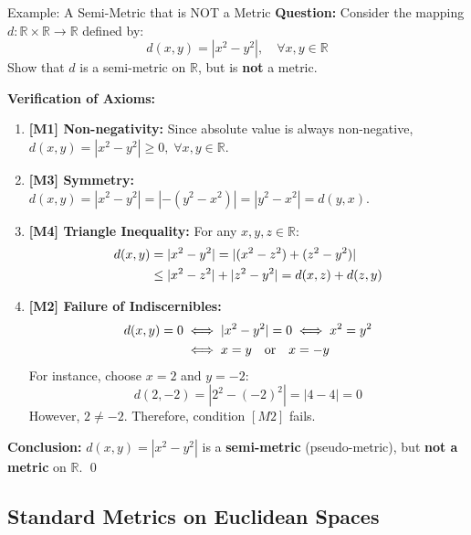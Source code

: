 \documentclass[11pt,a4paper]{article}
\begin{document}
\begin{exbox}{Example: A Semi-Metric that is NOT a Metric}
\textbf{Question:} Consider the mapping $d: \mathbb{R} \times \mathbb{R} \to \mathbb{R}$ defined by:
\begin{equation}
    d(x, y) = |x^2 - y^2|, \quad \forall x, y \in \mathbb{R}
\end{equation}
Show that $d$ is a semi-metric on $\mathbb{R}$, but is \textbf{not} a metric.

\textbf{Verification of Axioms:}
\begin{enumerate}
    \item \textbf{[M1] Non-negativity:} Since absolute value is always non-negative, $d(x, y) = |x^2 - y^2| \ge 0, \; \forall x, y \in \mathbb{R}$.
    
    \item \textbf{[M3] Symmetry:} $d(x, y) = |x^2 - y^2| = |-(y^2 - x^2)| = |y^2 - x^2| = d(y, x)$.
    
    \item \textbf{[M4] Triangle Inequality:} For any $x, y, z \in \mathbb{R}$:
    \begin{align}
        d(x, y) &= |x^2 - y^2| = |(x^2 - z^2) + (z^2 - y^2)| \notag \\
        &\le |x^2 - z^2| + |z^2 - y^2| = d(x, z) + d(z, y)
    \end{align}
    
    \item \textbf{[M2] Failure of Indiscernibles:}
    \begin{align}
        d(x, y) = 0 &\iff |x^2 - y^2| = 0 \iff x^2 = y^2 \notag \\
        &\iff x = y \quad \text{or} \quad x = -y
    \end{align}
    For instance, choose $x = 2$ and $y = -2$:
    $$d(2, -2) = |2^2 - (-2)^2| = |4 - 4| = 0$$
    However, $2 \neq -2$. Therefore, condition $[M2]$ fails.
\end{enumerate}
\textbf{Conclusion:} $d(x, y) = |x^2 - y^2|$ is a \textbf{semi-metric} (pseudo-metric), but \textbf{not a metric} on $\mathbb{R}$. \qed
\end{exbox}

\newpage

\subsection{Standard Metrics on Euclidean Spaces}
\end{document}
